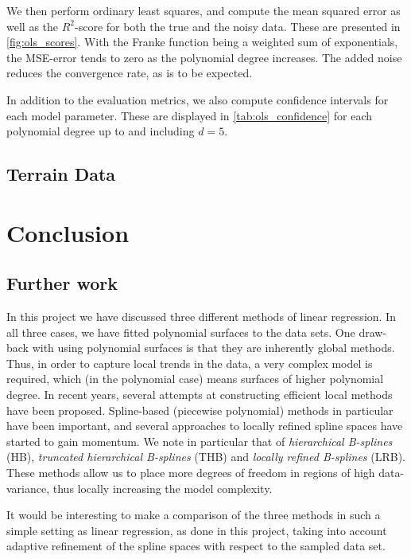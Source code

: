 \documentclass[dvipsnames, article, a4paper, oneside, 12pt]{memoir}
\begin{document}
  We then perform ordinary least squares, and compute the mean squared error as
  well as the \( R^2 \)-score for both the true and the noisy data. These are
  presented in \cref{fig:ols_scores}. With the Franke function being a weighted
  sum of exponentials, the MSE-error tends to zero as the polynomial degree
  increases. The added noise reduces the convergence rate, as is to be
  expected. 
  
  In addition to the evaluation metrics, we also compute confidence intervals
  for each model parameter. These are displayed in \cref{tab:ols_confidence}
  for each polynomial degree up to and including \( d = 5 \).
  
  \begin{table}
    \caption{}
    \label{tab:ols_confidence}
  \end{table}
  \section{Terrain Data}
	
  \chapter{Conclusion}

  
  \section{Further work}

  In this project we have discussed three different methods of linear
  regression.  In all three cases, we have fitted polynomial surfaces to the
  data sets. One draw-back with using polynomial surfaces is that they are
  inherently global methods. Thus, in order to capture local trends in the
  data, a very complex model is required, which (in the polynomial case) means
  surfaces of higher polynomial degree. In recent years, several attempts at
  constructing efficient local methods have been proposed. Spline-based
  (piecewise polynomial) methods in particular have been important, and several
  approaches to locally refined spline spaces have started to gain momentum.
  We note in particular that of \emph{hierarchical B-splines} (HB),
  \emph{truncated hierarchical B-splines} (THB) and \emph{locally refined
  B-splines} (LRB). These methods allow us to place more degrees of freedom in regions of high
  data-variance, thus locally increasing the model complexity. 

  It would be interesting to make a comparison of the three methods in such a
  simple setting as linear regression, as done in this project, taking into
  account adaptive refinement of the spline spaces with respect to the sampled
  data set.
 
\end{document}
